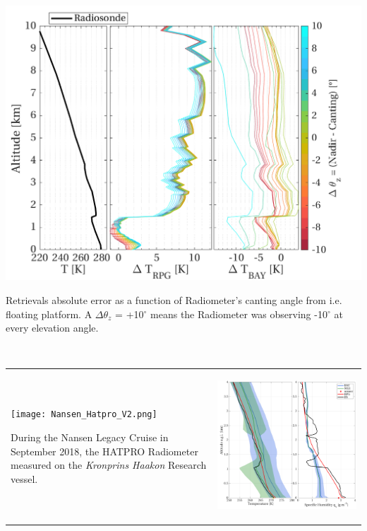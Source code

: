 \documentclass[landscape,paperwidth=1189mm,paperheight=841mm,fontscale=0.4,margin=.7cm]{baposter}
\begin{document}
\begin{poster}
{%
  \begin{minipage}{0.9\linewidth}
    \vspace{-0.5em}
    \begin{center}
      \includegraphics[width=.67\linewidth]{RS_T_canting_RET.png}\\
    \end{center}
	{\vspace{-2px} \small
	Retrievals absolute error as a function of Radiometer's canting angle from i.e. floating platform. A $\Delta \theta_z$ = +10$^\circ$ means the Radiometer was observing -10$^\circ$ at every elevation angle.}
  \end{minipage}\\
\begin{tabular}{@{}l|c@{}}
	\begin{minipage}{0.35\linewidth}
		\begin{center}
		\texttt{[image: Nansen\_Hatpro\_V2.png]}
	\end{center}
	{\small During the Nansen Legacy Cruise in September 2018, the HATPRO Radiometer measured on the \textit{Kronprins Haakon} Research vessel.}
	\end{minipage}
	&
  \begin{minipage}{0.55\linewidth}
    \begin{center}
    	   \includegraphics[width=.75\linewidth]{NansenL_200918_BL.png}

\end{center}
\end{minipage}
\end{tabular}}
\end{poster}
\end{document}
